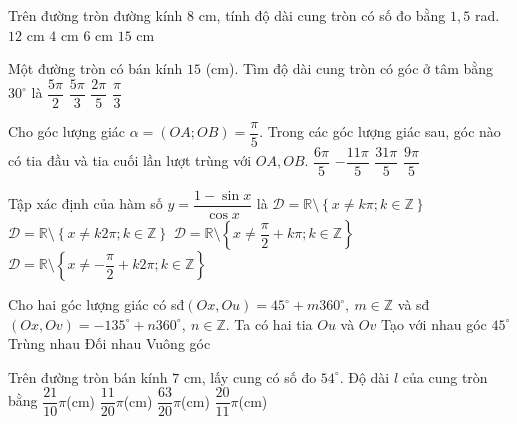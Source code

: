\begin{ex}%
Trên đường tròn đường kính $8$ cm, tính độ dài cung tròn có số đo bằng $1{,}5$ rad.
\choice
{$12$ cm}
{$4$ cm}
{\True $6$ cm}
{$15$ cm}
\end{ex}

\begin{ex}%
Một đường tròn có bán kính $15$ (cm). Tìm độ dài cung tròn có góc ở tâm bằng $30^\circ$ là
\choice
{\True $\dfrac{5\pi }{2}$}
{$\dfrac{5\pi }{3}$}
{$\dfrac{2\pi }{5}$}
{$\dfrac{\pi }{3}$}
\loigiai{
\[l=\dfrac{\pi a\cdot R}{180}=\dfrac{\pi \cdot 30\cdot 15}{180}=\dfrac{5\pi }{2}.\]}
\end{ex}

\begin{ex}%
Cho góc lượng giác $\alpha =(OA;OB)=\dfrac{\pi }{5}$. Trong các góc lượng giác sau, góc nào có tia đầu và tia cuối lần lượt trùng với $OA,OB$.
\choice
{$\dfrac{6\pi }{5}$}
{$-\dfrac{11\pi }{5}$}
{\True $\dfrac{31\pi }{5}$}
{$\dfrac{9\pi }{5}$}
\loigiai{
\[\dfrac{31\pi }{5}=\dfrac{\pi }{5}+6\pi =\dfrac{\pi }{5}+3\cdot 2\pi .\] }
\end{ex}

\begin{ex}%
Tập xác định của hàm số $y=\dfrac{1-\sin x}{\cos x}$ là
\choice
{$\mathscr{D}=\mathbb{R}\setminus\left\{ x\ne k\pi ;k\in\mathbb{Z}\right\}$}
{$\mathscr{D}=\mathbb{R}\setminus\left\{ x\ne k2\pi ;k\in\mathbb{Z}\right\}$}
{\True $\mathscr{D}=\mathbb{R}\setminus\left\{ x\ne\dfrac{\pi}{2}+k\pi ;k\in\mathbb{Z}\right\}$}
{$\mathscr{D}=\mathbb{R}\setminus\left\{ x\ne-\dfrac{\pi}{2}+k2\pi ;k\in\mathbb{Z}\right\}$}
\end{ex}

\begin{ex}%
Cho hai góc lượng giác có sđ$(Ox,Ou)=45^\circ+m360^\circ,\ m\in \mathbb{Z}$ và sđ$(Ox,Ov)=-135^\circ+n360^\circ,\ n\in \mathbb{Z}$. Ta có hai tia $Ou$ và $Ov$
\choice
{Tạo với nhau góc $45^\circ$}
{Trùng nhau}
{\True Đối nhau}
{Vuông góc}
\end{ex}

\begin{ex}%
Trên đường tròn bán kính $7$ cm, lấy cung có số đo $54^\circ$. Độ dài $l$ của cung tròn bằng
\choice
{\True $\dfrac{21}{10}\pi$(cm)}
{$\dfrac{11}{20}\pi$(cm)}
{$\dfrac{63}{20}\pi$(cm)}
{$\dfrac{20}{11}\pi$(cm)}
\end{ex}

